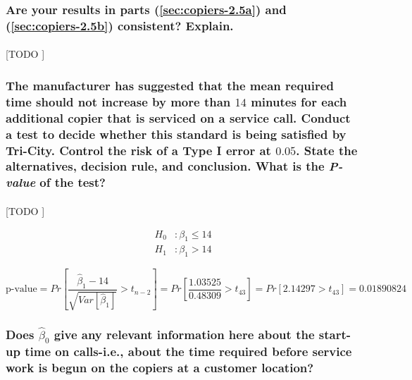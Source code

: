 \documentclass{article}
\begin{document}
      \subsubsection{Are your results in parts (\ref{sec:copiers-2.5a}) and (\ref{sec:copiers-2.5b}) consistent? Explain.}

        \paragraph{}
        [TODO ]

      \subsubsection{The manufacturer has suggested that the mean required time should not increase by more
than $14$ minutes for each additional copier that is serviced on a service call. Conduct a test to decide whether this standard is being satisfied by Tri-City. Control the risk of a Type I error at $0.05$. State the alternatives, decision rule, and conclusion. What is the \emph{P-value} of the test?}

        \paragraph{}
        [TODO ]

        \begin{equation}
          \begin{split}
            H_0&: \beta_1 \leq 14 \\
            H_1&: \beta_1 > 14
          \end{split}
        \end{equation}


        \begin{equation}
            \text{p-value}
            = Pr\left[\frac{\widehat{\beta}_1 - 14}{\sqrt{Var\left[\widehat{\beta}_1\right]}} > t_{n-2}\right]
            = Pr\left[\frac{1.03525}{0.48309} > t_{43}\right]
            = Pr\left[2.14297 > t_{43}\right]
            = 0.01890824
        \end{equation}


      \subsubsection{Does $\widehat{\beta}_0$ give any relevant information here about the start-up time on calls-i.e., about the time required before service work is begun on the copiers at a customer location?}
      \label{sec:copiers-2.5e}
\end{document}
